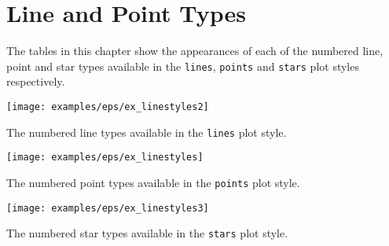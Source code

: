 %
%
%
%
%



\chapter{Line and Point Types}
\label{ch:linetypes_table}

The tables in this chapter show the appearances of each of the numbered line,
point and star types available in the {\tt lines}, {\tt points} and {\tt stars}
plot styles respectively.

\begin{table}
\begin{center}
\texttt{[image: examples/eps/ex\_linestyles2]}
\end{center}
\caption{The numbered line types available in the {\tt lines} plot style.}
\end{table}

\begin{table}
\begin{center}
\texttt{[image: examples/eps/ex\_linestyles]}
\end{center}
\caption{The numbered point types available in the {\tt points} plot style.}
\end{table}

\begin{table}
\begin{center}
\texttt{[image: examples/eps/ex\_linestyles3]}
\end{center}
\caption{The numbered star types available in the {\tt stars} plot style.}
\end{table}

